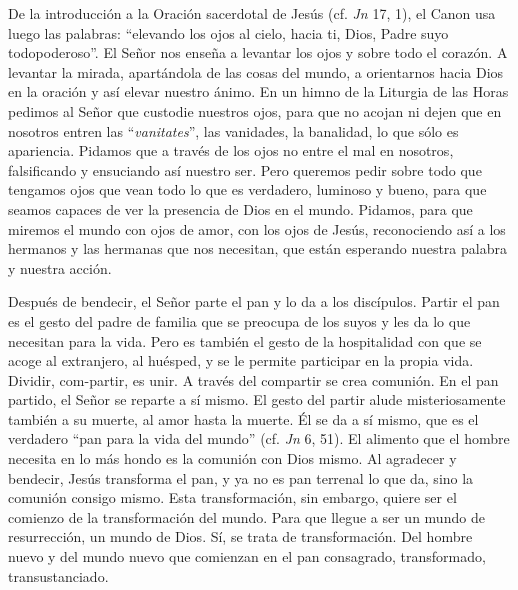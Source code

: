 			\begin{body}De la introducción a la Oración sacerdotal de Jesús (cf. \textit{Jn} 17, 1), el Canon usa luego las palabras: “elevando los ojos al cielo, hacia ti, Dios, Padre suyo todopoderoso”. El Señor nos enseña a levantar los ojos y sobre todo el corazón. A levantar la mirada, apartándola de las cosas del mundo, a orientarnos hacia Dios en la oración y así elevar nuestro ánimo. En un himno de la Liturgia de las Horas pedimos al Señor que custodie nuestros ojos, para que no acojan ni dejen que en nosotros entren las “\textit{vanitates}”, las vanidades, la banalidad, lo que sólo es apariencia. Pidamos que a través de los ojos no entre el mal en nosotros, falsificando y ensuciando así nuestro ser. Pero queremos pedir sobre todo que tengamos ojos que vean todo lo que es verdadero, luminoso y bueno, para que seamos capaces de ver la presencia de Dios en el mundo. Pidamos, para que miremos el mundo con ojos de amor, con los ojos de Jesús, reconociendo así a los hermanos y las hermanas que nos necesitan, que están esperando nuestra palabra y nuestra acción.\end{body}
			
			\begin{body}Después de bendecir, el Señor parte el pan y lo da a los discípulos. Partir el pan es el gesto del padre de familia que se preocupa de los suyos y les da lo que necesitan para la vida. Pero es también el gesto de la hospitalidad con que se acoge al extranjero, al huésped, y se le permite participar en la propia vida. Dividir, com-partir, es unir. A través del compartir se crea comunión. En el pan partido, el Señor se reparte a sí mismo. El gesto del partir alude misteriosamente también a su muerte, al amor hasta la muerte. Él se da a sí mismo, que es el verdadero “pan para la vida del mundo” (cf. \textit{Jn} 6, 51). El alimento que el hombre necesita en lo más hondo es la comunión con Dios mismo. Al agradecer y bendecir, Jesús transforma el pan, y ya no es pan terrenal lo que da, sino la comunión consigo mismo. Esta transformación, sin embargo, quiere ser el comienzo de la transformación del mundo. Para que llegue a ser un mundo de resurrección, un mundo de Dios. Sí, se trata de transformación. Del hombre nuevo y del mundo nuevo que comienzan en el pan consagrado, transformado, transustanciado.\end{body}
			
